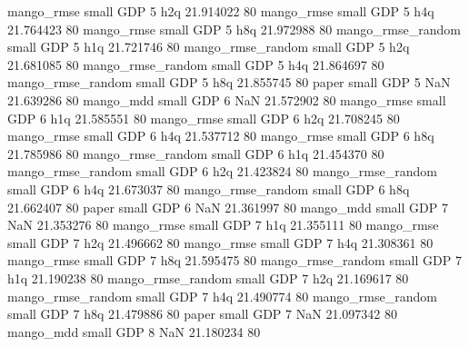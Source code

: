        mango_rmse      small      GDP                 5                  h2q 21.914022 80
       mango_rmse      small      GDP                 5                  h4q 21.764423 80
       mango_rmse      small      GDP                 5                  h8q 21.972988 80
mango_rmse_random      small      GDP                 5                  h1q 21.721746 80
mango_rmse_random      small      GDP                 5                  h2q 21.681085 80
mango_rmse_random      small      GDP                 5                  h4q 21.864697 80
mango_rmse_random      small      GDP                 5                  h8q 21.855745 80
            paper      small      GDP                 5                  NaN 21.639286 80
        mango_mdd      small      GDP                 6                  NaN 21.572902 80
       mango_rmse      small      GDP                 6                  h1q 21.585551 80
       mango_rmse      small      GDP                 6                  h2q 21.708245 80
       mango_rmse      small      GDP                 6                  h4q 21.537712 80
       mango_rmse      small      GDP                 6                  h8q 21.785986 80
mango_rmse_random      small      GDP                 6                  h1q 21.454370 80
mango_rmse_random      small      GDP                 6                  h2q 21.423824 80
mango_rmse_random      small      GDP                 6                  h4q 21.673037 80
mango_rmse_random      small      GDP                 6                  h8q 21.662407 80
            paper      small      GDP                 6                  NaN 21.361997 80
        mango_mdd      small      GDP                 7                  NaN 21.353276 80
       mango_rmse      small      GDP                 7                  h1q 21.355111 80
       mango_rmse      small      GDP                 7                  h2q 21.496662 80
       mango_rmse      small      GDP                 7                  h4q 21.308361 80
       mango_rmse      small      GDP                 7                  h8q 21.595475 80
mango_rmse_random      small      GDP                 7                  h1q 21.190238 80
mango_rmse_random      small      GDP                 7                  h2q 21.169617 80
mango_rmse_random      small      GDP                 7                  h4q 21.490774 80
mango_rmse_random      small      GDP                 7                  h8q 21.479886 80
            paper      small      GDP                 7                  NaN 21.097342 80
        mango_mdd      small      GDP                 8                  NaN 21.180234 80
